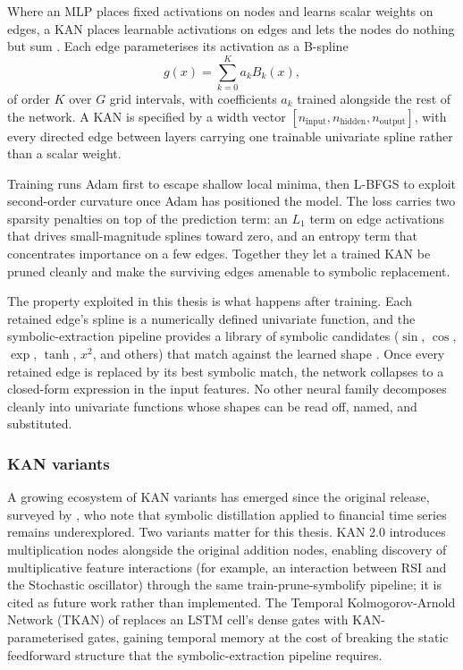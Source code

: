 Where an MLP places fixed activations on nodes and learns scalar weights on edges, a KAN places learnable activations on edges and lets the nodes do nothing but sum \citep{liu_kan_2024}. Each edge parameterises its activation as a B-spline
\begin{equation}
g(x) = \sum_{k=0}^{K} a_k B_k(x),
\label{eq:kan_edge}
\end{equation}
of order $K$ over $G$ grid intervals, with coefficients $a_k$ trained alongside the rest of the network. A KAN is specified by a width vector $[n_{\text{input}}, n_{\text{hidden}}, n_{\text{output}}]$, with every directed edge between layers carrying one trainable univariate spline rather than a scalar weight.

Training runs Adam first to escape shallow local minima, then L-BFGS to exploit second-order curvature once Adam has positioned the model. The loss carries two sparsity penalties on top of the prediction term: an $L_1$ term on edge activations that drives small-magnitude splines toward zero, and an entropy term that concentrates importance on a few edges. Together they let a trained KAN be pruned cleanly and make the surviving edges amenable to symbolic replacement.

The property exploited in this thesis is what happens after training. Each retained edge's spline is a numerically defined univariate function, and the symbolic-extraction pipeline provides a library of symbolic candidates ($\sin$, $\cos$, $\exp$, $\tanh$, $x^2$, and others) that match against the learned shape \citep{liu_kan_2024}. Once every retained edge is replaced by its best symbolic match, the network collapses to a closed-form expression in the input features. No other neural family decomposes cleanly into univariate functions whose shapes can be read off, named, and substituted.


\subsubsection{KAN variants}\label{subsubsec:kan_variants}

A growing ecosystem of KAN variants has emerged since the original release, surveyed by \citet{yamak_et_al_2025}, who note that symbolic distillation applied to financial time series remains underexplored. Two variants matter for this thesis. KAN 2.0 \citep{liu_kan2_2024} introduces multiplication nodes alongside the original addition nodes, enabling discovery of multiplicative feature interactions (for example, an interaction between RSI and the Stochastic oscillator) through the same train-prune-symbolify pipeline; it is cited as future work rather than implemented. The Temporal Kolmogorov-Arnold Network (TKAN) of \citet{genet_inzirillo_2024} replaces an LSTM cell's dense gates with KAN-parameterised gates, gaining temporal memory at the cost of breaking the static feedforward structure that the symbolic-extraction pipeline requires.


